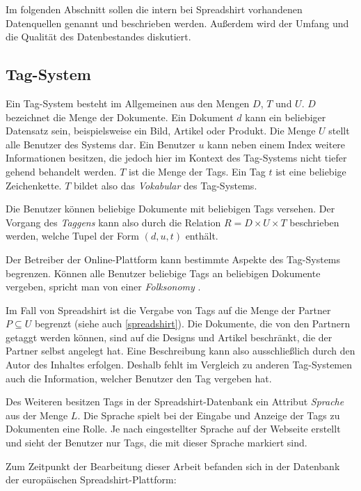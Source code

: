 Im folgenden Abschnitt sollen die intern bei Spreadshirt vorhandenen Datenquellen genannt und beschrieben werden. Außerdem wird der Umfang und die Qualität des Datenbestandes diskutiert.

\subsection{Tag-System}
\label{tag-system}

Ein Tag-System besteht im Allgemeinen aus den Mengen \(D\), \(T\) und \(U\). \(D\) bezeichnet die Menge der Dokumente. Ein Dokument \(d\) kann ein beliebiger Datensatz sein, beispielsweise ein Bild, Artikel oder Produkt. Die Menge \(U\) stellt alle Benutzer des Systems dar. Ein Benutzer \(u\) kann neben einem Index weitere Informationen besitzen, die jedoch hier im Kontext des Tag-Systems nicht tiefer gehend behandelt werden. \(T\) ist die Menge der Tags. Ein Tag \(t\) ist eine beliebige Zeichenkette. \(T\) bildet also das \emph{Vokabular} des Tag-Systems.

Die Benutzer können beliebige Dokumente mit beliebigen Tags versehen. Der Vorgang des \emph{Taggens} kann also durch die Relation \(R = D \times U \times T\) beschrieben werden, welche Tupel der Form \((d, u, t)\) enthält.

Der Betreiber der Online-Plattform kann bestimmte Aspekte des Tag-Systems begrenzen. Können alle Benutzer beliebige Tags an beliebigen Dokumente vergeben, spricht man von einer \emph{Folksonomy} \cite{ip2009}.

Im Fall von Spreadshirt ist die Vergabe von Tags auf die Menge der Partner \(P \subseteq U\) begrenzt (siehe auch \ref{spreadshirt}). Die Dokumente, die von den Partnern getaggt werden können, sind auf die Designs und Artikel beschränkt, die der Partner selbst angelegt hat. Eine Beschreibung kann also ausschließlich durch den Autor des Inhaltes erfolgen. Deshalb fehlt im Vergleich zu anderen Tag-Systemen auch die Information, welcher Benutzer den Tag vergeben hat.

Des Weiteren besitzen Tags in der Spreadshirt-Datenbank ein Attribut \emph{Sprache} aus der Menge \(L\). Die Sprache spielt bei der Eingabe und Anzeige der Tags zu Dokumenten eine Rolle. Je nach eingestellter Sprache auf der Webseite erstellt und sieht der Benutzer nur Tags, die mit dieser Sprache markiert sind.

Zum Zeitpunkt der Bearbeitung dieser Arbeit befanden sich in der Datenbank der europäischen Spreadshirt-Plattform:

